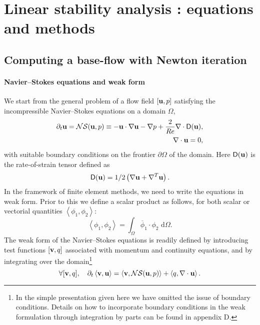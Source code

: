 \documentclass[twocolumn,10pt]{asme2ej}
\newcommand{\be}[1]{ \begin{equation} \label{#1}}
\newcommand{\ee}{\end{equation}}
\begin{document}

\section{Linear stability analysis : equations and methods}
\vspace{.2cm}

\subsection{Computing a base-flow with Newton iteration}
\vspace{.2cm}

\paragraph{Navier--Stokes equations and weak form}

We start from the general problem of a flow field $[{\bf u},p]$ satisfying the incompressible Navier--Stokes equations on a domain $\Omega$,
\begin{eqnarray} \label{NSprimitive}
\partial_t {\bf u} = {\cal NS} ({\bf u},p)
\equiv - {\bf u} \cdot \nabla {\bf u} - \nabla p + \frac{2}{Re}  \nabla \cdot {\mathsf{D}}({\bf u}),  \\
\nabla \cdot {\bf u} = 0,
\end{eqnarray}
with suitable boundary conditions on the frontier $\partial \Omega$ of the domain.
Here $ {\mathsf{D}}({\bf u}) $ is the rate-of-strain tensor defined as
$$
 {\mathsf{D}}({\bf u}) = 1/2
\left( \nabla {\bf u} +  \nabla^T  {\bf u}\right).
$$ 
In the framework of finite element methods, we need to write the equations in weak form.
Prior to this we define a scalar product as follows, for both scalar or vectorial quantities 
$\left< \phi_1, \phi_2 \right> $:
$$
\left< \phi_1, \phi_2 \right> = \int_\Omega \overline{\phi}_1 \cdot \phi_2   \mbox{ d} \Omega.
$$
The weak form of the Navier--Stokes equations is readily defined by introducing test functions 
$[{\bf v},q]$ associated with momentum and continuity equations, and by integrating over the domain\footnote{In the simple presentation given here we have omitted the issue of boundary conditions. Details on how to incorporate boundary conditions in the weak formulation through integration by parts can be found in appendix D.}
\be{NSweak}
\forall [{\bf v},q], \quad \partial_t \left< {\bf v}, {\bf u}\right> = \left< {\bf v} , {\cal NS} ({\bf u},p) \right> + \left< q, \nabla \cdot {\bf u}\right>.
\ee
\end{document}
